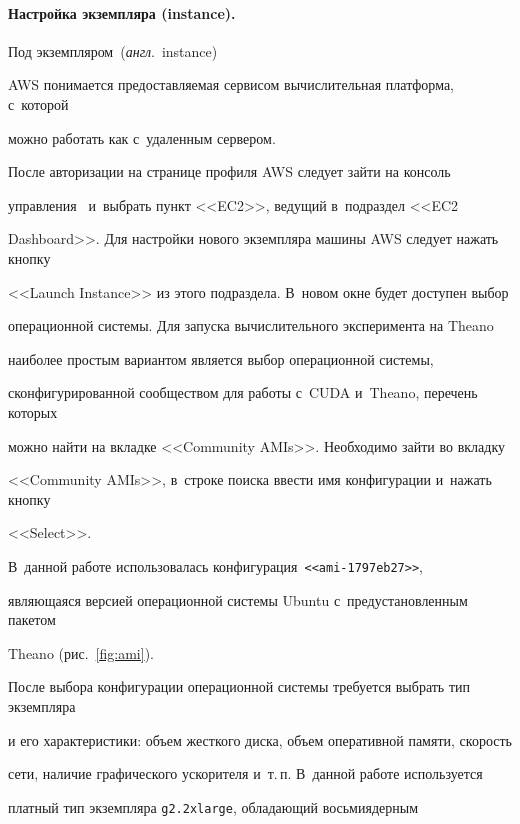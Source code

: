\vspace*{-12pt}





\paragraph*{Настройка экземпляра (instance).} Под экземпляром~(\textit{англ}.\ instance) 


AWS понимается предоставляемая сервисом вычислительная платформа, с~которой 


можно работать как с~удаленным сервером.


После авторизации на странице профиля AWS следует зайти на консоль 


управления~\cite{console} и~выбрать пункт <<EC2>>, ведущий в~подраздел <<EC2 


Dashboard>>. Для настройки нового экземпляра машины AWS следует нажать кнопку 


<<Launch Instance>> из этого подраздела. В~новом окне будет доступен выбор 


операционной системы. Для запуска вычислительного эксперимента на Theano 


наиболее простым вариантом является выбор операционной системы, 


сконфигурированной сообществом для работы с~CUDA и~Theano, перечень которых 


можно найти на вкладке <<Community AMIs>>. Необходимо зайти во вкладку 


<<Community AMIs>>, в~строке поиска ввести имя конфигурации и~нажать кнопку 


<<Select>>.


В~данной работе использовалась конфигурация~\texttt{<<ami-1797eb27>>}, 


являющаяся версией операционной системы Ubuntu с~предустановленным пакетом 


Theano (рис.~\ref{fig:ami}).








После выбора конфигурации операционной системы требуется выбрать тип экземпляра 


и его характеристики: объем жесткого диска, объем оперативной памяти, скорость 


сети, наличие графического ускорителя и~т.\,п. В~данной работе используется 


платный тип экземпляра \texttt{g2.2xlarge}, обладающий восьмиядерным 


